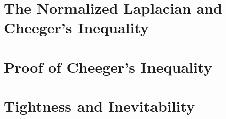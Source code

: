 \section{The Normalized Laplacian and Cheeger's Inequality}


\section{Proof of Cheeger's Inequality}


\section{Tightness and Inevitability}
